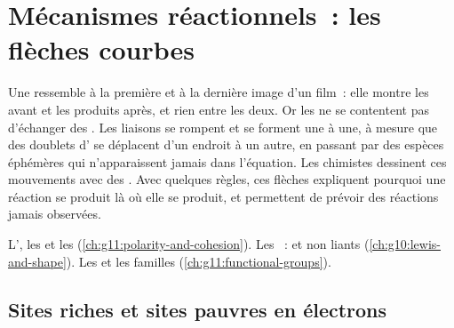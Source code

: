 \chapter{Mécanismes réactionnels~: les flèches courbes}\label{ch:g12:curly-arrows}

Une  ressemble à la première et à la dernière image d'un
film~: elle montre les  avant et les produits après, et rien
entre les deux. Or les  ne se contentent pas d'échanger des
. Les liaisons se rompent et se forment une à une, à mesure que
des doublets d' se déplacent d'un endroit à un autre, en
passant par des espèces éphémères qui n'apparaissent jamais dans
l'équation. Les chimistes dessinent ces mouvements avec des . Avec quelques règles, ces flèches expliquent pourquoi une
réaction se produit là où elle se produit, et permettent de prévoir des
réactions jamais observées.

\begin{recall}
L', les  et les 
(\cref{ch:g11:polarity-and-cohesion}). Les ~:  et non liants (\cref{ch:g10:lewis-and-shape}). Les  et les familles (\cref{ch:g11:functional-groups}).
\end{recall}

\section{Sites riches et sites pauvres en électrons}

